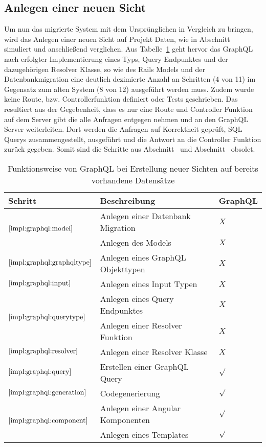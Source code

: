 \subsection{Anlegen einer neuen Sicht}
Um nun das migrierte System mit dem Ursprünglichen in Vergleich zu bringen, wird das Anlegen einer neuen Sicht auf Projekt Daten, wie in Abschnitt~ simuliert und anschließend verglichen.
Aus Tabelle~\ref{impl:tbl:newview} geht hervor das GraphQL nach erfolgter Implementierung eines Typs, Query Endpunktes und der dazugehörigen Resolver Klasse, so wie des Rails Models und der Datenbankmigration eine deutlich dezimierte Anzahl an Schritten (4 von 11) im Gegensatz zum alten System (8 von 12) ausgeführt werden muss.
Zudem wurde keine Route, bzw. Controllerfunktion definiert oder Tests geschrieben.
Das resultiert aus der Gegebenheit, dass es nur eine Route und Controller Funktion auf dem Server gibt die alle Anfragen entgegen nehmen und an den GraphQL Server weiterleiten. Dort werden die Anfragen auf Korrektheit geprüft,
SQL Querys zusammengestellt, ausgeführt und die Antwort an die Controller Funktion zurück gegeben.
Somit sind die Schritte aus Abschnitt~ und Abschnitt~ obsolet.

\begin{table}[h!]
	\begin{tabular}{|p{}|p{}|p{}|}
		\hline
		\textbf{Schritt} & \textbf{Beschreibung} & \textbf{GraphQL} \\ \hline
		\multirow{2}{*}{$\ref{impl:graphql:model}$}
			& Anlegen einer Datenbank Migration & $X$ \\
			& Anlegen des Models & $X$ \\ \hline
		$\ref{impl:graphql:graphqltype}$ & Anlegen eines GraphQL Objekttypen &  $X$ \\ \hline
		$\ref{impl:graphql:input}$ & Anlegen eines Input Typen &  $X$ \\ \hline
		\multirow{2}{*}{$\ref{impl:graphql:querytype}$}
			& Anlegen eines Query Endpunktes &  $X$ \\ 
			& Anlegen einer Resolver Funktion &  $X$ \\ \hline
		$\ref{impl:graphql:resolver}$ & Anlegen einer Resolver Klasse &  $X$ \\ \hline
		$\ref{impl:graphql:query}$ & Erstellen einer GraphQL Query &  $\surd$ \\ \hline
		$\ref{impl:graphql:generation}$ & Codegenerierung &  $\surd$ \\ \hline
		\multirow{2}{*}{$\ref{impl:graphql:component}$}
			& Anlegen einer Angular Komponenten & $\surd$ \\
			& Anlegen eines Templates & $\surd$ \\ \hline
	\end{tabular}
	\vspace{5pt}
	\centering
	\caption{Funktionsweise von GraphQL bei Erstellung neuer Sichten auf bereits vorhandene Datensätze}
	\label{impl:tbl:newview}
\end{table}


